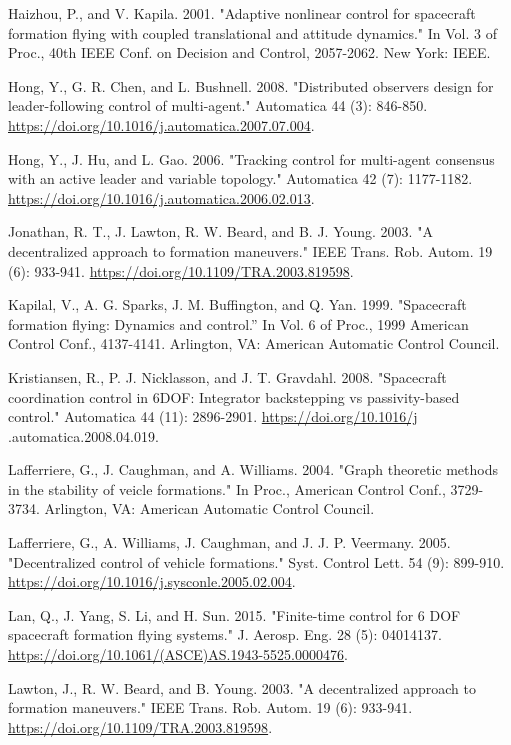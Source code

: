 \documentclass[10pt]{article}
\begin{document}
Haizhou, P., and V. Kapila. 2001. "Adaptive nonlinear control for spacecraft formation flying with coupled translational and attitude dynamics." In Vol. 3 of Proc., 40th IEEE Conf. on Decision and Control, 2057-2062. New York: IEEE.

Hong, Y., G. R. Chen, and L. Bushnell. 2008. "Distributed observers design for leader-following control of multi-agent." Automatica 44 (3): 846-850. \href{https://doi.org/10.1016/j.automatica.2007.07.004}{https://doi.org/10.1016/j.automatica.2007.07.004}.

Hong, Y., J. Hu, and L. Gao. 2006. "Tracking control for multi-agent consensus with an active leader and variable topology." Automatica 42 (7): 1177-1182. \href{https://doi.org/10.1016/j.automatica.2006.02.013}{https://doi.org/10.1016/j.automatica.2006.02.013}.

Jonathan, R. T., J. Lawton, R. W. Beard, and B. J. Young. 2003. "A decentralized approach to formation maneuvers." IEEE Trans. Rob. Autom. 19 (6): 933-941. \href{https://doi.org/10.1109/TRA.2003.819598}{https://doi.org/10.1109/TRA.2003.819598}.

Kapilal, V., A. G. Sparks, J. M. Buffington, and Q. Yan. 1999. "Spacecraft formation flying: Dynamics and control.” In Vol. 6 of Proc., 1999 American Control Conf., 4137-4141. Arlington, VA: American Automatic Control Council.

Kristiansen, R., P. J. Nicklasson, and J. T. Gravdahl. 2008. "Spacecraft coordination control in 6DOF: Integrator backstepping vs passivity-based control." Automatica 44 (11): 2896-2901. \href{https://doi.org/10.1016/j}{https://doi.org/10.1016/j} .automatica.2008.04.019.

Lafferriere, G., J. Caughman, and A. Williams. 2004. "Graph theoretic methods in the stability of veicle formations." In Proc., American Control Conf., 3729-3734. Arlington, VA: American Automatic Control Council.

Lafferriere, G., A. Williams, J. Caughman, and J. J. P. Veermany. 2005. "Decentralized control of vehicle formations." Syst. Control Lett. 54 (9): 899-910. \href{https://doi.org/10.1016/j.sysconle.2005.02.004}{https://doi.org/10.1016/j.sysconle.2005.02.004}.

Lan, Q., J. Yang, S. Li, and H. Sun. 2015. "Finite-time control for 6 DOF spacecraft formation flying systems." J. Aerosp. Eng. 28 (5): 04014137. \href{https://doi.org/10.1061/(ASCE)AS.1943-5525.0000476}{https://doi.org/10.1061/(ASCE)AS.1943-5525.0000476}.

Lawton, J., R. W. Beard, and B. Young. 2003. "A decentralized approach to formation maneuvers." IEEE Trans. Rob. Autom. 19 (6): 933-941. \href{https://doi.org/10.1109/TRA.2003.819598}{https://doi.org/10.1109/TRA.2003.819598}.
\end{document}
